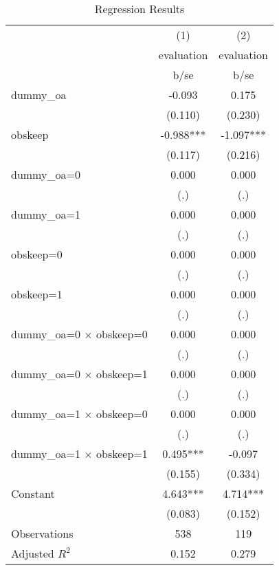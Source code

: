 \begin{table}[htbp]\centering
\def\sym#1{\ifmmode^{#1}\else\(^{#1}\)\fi}
\caption{Regression Results}
\begin{tabular}{l*{2}{c}}
\hline\hline
                    &\multicolumn{1}{c}{(1)}&\multicolumn{1}{c}{(2)}\\
                    &\multicolumn{1}{c}{evaluation}&\multicolumn{1}{c}{evaluation}\\
                    &        b/se   &        b/se   \\
\hline
dummy\_oa            &      -0.093   &       0.175   \\
                    &     (0.110)   &     (0.230)   \\
obskeep             &      -0.988***&      -1.097***\\
                    &     (0.117)   &     (0.216)   \\
dummy\_oa=0          &       0.000   &       0.000   \\
                    &         (.)   &         (.)   \\
dummy\_oa=1          &       0.000   &       0.000   \\
                    &         (.)   &         (.)   \\
obskeep=0           &       0.000   &       0.000   \\
                    &         (.)   &         (.)   \\
obskeep=1           &       0.000   &       0.000   \\
                    &         (.)   &         (.)   \\
dummy\_oa=0 $\times$ obskeep=0&       0.000   &       0.000   \\
                    &         (.)   &         (.)   \\
dummy\_oa=0 $\times$ obskeep=1&       0.000   &       0.000   \\
                    &         (.)   &         (.)   \\
dummy\_oa=1 $\times$ obskeep=0&       0.000   &       0.000   \\
                    &         (.)   &         (.)   \\
dummy\_oa=1 $\times$ obskeep=1&       0.495***&      -0.097   \\
                    &     (0.155)   &     (0.334)   \\
Constant            &       4.643***&       4.714***\\
                    &     (0.083)   &     (0.152)   \\
\hline
Observations        &         538   &         119   \\
Adjusted \(R^{2}\)  &       0.152   &       0.279   \\
\hline\hline
\end{tabular}
\end{table}
